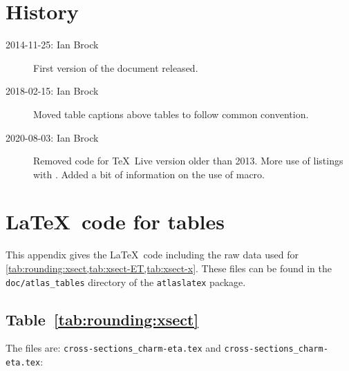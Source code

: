 \documentclass[REPORT=false, UKenglish, texlive=2020]{atlasdoc}
\begin{document}
\clearpage
\section*{History}

\begin{description}
\item[2014-11-25: Ian Brock] First version of the document released.
\item[2018-02-15: Ian Brock] Moved table captions above tables to follow common convention.
\item[2020-08-03: Ian Brock] Removed code for \TeX\ Live version older than 2013.
  More use of listings with .
  Added a bit of information on the use of  macro.
\end{description}


\printbibliography
% 
% 

\clearpage
\appendix
\section{\LaTeX\ code for tables}
\label{sec:raw-data}

This appendix gives the \LaTeX\ code including the raw data used for
\cref{tab:rounding:xsect,tab:xsect-ET,tab:xsect-x}.
These files can be found in the \texttt{doc/atlas\_tables} directory
of the \texttt{atlaslatex} package.

\subsection{Table~\protect\ref{tab:rounding:xsect}}

The files are: \texttt{cross-sections\_charm-eta.tex} and
\texttt{cross-sections\_charm-eta.tex}:

\end{document}
